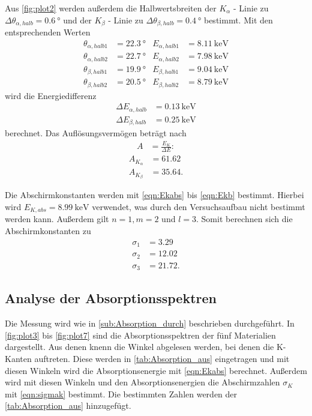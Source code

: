 Aus \autoref{fig:plot2} werden außerdem die Halbwertsbreiten der $K_\alpha$ - Linie zu $\Delta\theta_{\alpha,halb}=\qty{0.6}{\degree}$ und
der $K_\beta$ - Linie zu $\Delta\theta_{\beta,halb}=\qty{0.4}{\degree}$ bestimmt.
Mit den entsprechenden Werten  
\begin{align*}
  \theta_{\alpha,halb1}&=\qty{22.3}{\degree}  & E_{\alpha,halb1}&= \qty{8.11}{\kilo\electronvolt}\\
  \theta_{\alpha,halb2}&=\qty{22.7}{\degree}  & E_{\alpha,halb2}&= \qty{7.98}{\kilo\electronvolt}\\
  \theta_{\beta,halb1}&=\qty{19.9}{\degree}    & E_{\beta,halb1}&= \qty{9.04}{\kilo\electronvolt}\\
  \theta_{\beta,halb2}&=\qty{20.5}{\degree}  & E_{\beta,halb2}&= \qty{8.79}{\kilo\electronvolt}
 \end{align*}
wird die Energiedifferenz
\begin{align*}
 \Delta E_{\alpha,halb}&= \qty{0.13}{\kilo\electronvolt}\\
 \Delta E_{\beta,halb}&= \qty{0.25}{\kilo\electronvolt}
\end{align*}
berechnet.
Das Auflösungsvermögen beträgt nach 
\begin{align*}
  A &= \frac{E_K}{\Delta E}:
\end{align*}
\begin{align*}
  A_{K_\alpha} &= 61.62\\
  A_{K_\beta} &= 35.64.
\end{align*}


Die Abschirmkonstanten werden mit \autoref{eqn:Ekabs} bis \autoref{eqn:Ekb} bestimmt. Hierbei wird
$E_{K,abs}= \qty{8.99}{\kilo\electronvolt}$\cite{X-Ray} verwendet, was durch den Versuchsaufbau nicht bestimmt werden kann.
Außerdem gilt $n=1, m=2$ und $l=3$.
Somit berechnen sich die Abschirmkonstanten zu
\begin{align*}
  \sigma_1 &= 3.29\\
  \sigma_2 &= 12.02\\
  \sigma_3 &= 21.72.
\end{align*}

\subsection{Analyse der Absorptionsspektren} %
\label{sub:Absorption_aus}
Die Messung wird wie in \autoref{sub:Absorption_durch} beschrieben durchgeführt.
In \autoref{fig:plot3} bis \ref{fig:plot7} sind die Absorptionsspektren der fünf Materialien dargestellt.
Aus denen knenn die Winkel abgelesen werden, bei denen die K-Kanten auftreten.
Diese werden in \autoref{tab:Absorption_aus} eingetragen und mit diesen Winkeln wird die Absorptionsenergie mit \autoref{eqn:Ekabs} berechnet.
Außerdem wird mit diesen Winkeln und den Absorptionsenergien die Abschirmzahlen $\sigma_K$ mit \autoref{eqn:sigmak} bestimmt.
Die bestimmten Zahlen werden der \autoref{tab:Absorption_aus} hinzugefügt.

